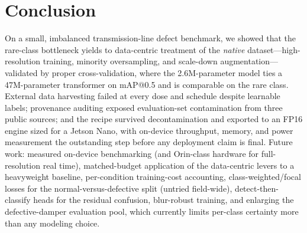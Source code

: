 \documentclass[conference]{IEEEtran}
\makeatletter
\newcommand{\map}{mAP@0.5}
\makeatother
\begin{document}
\section{Conclusion}
On a small, imbalanced transmission-line defect benchmark, we showed that the rare-class bottleneck yields to data-centric treatment of the \emph{native} dataset---high-resolution training, minority oversampling, and scale-down augmentation---validated by proper cross-validation, where the 2.6M-parameter model ties a 47M-parameter transformer on \map{} and is comparable on the rare class. External data harvesting failed at every dose and schedule despite learnable labels; provenance auditing exposed evaluation-set contamination from three public sources; and the recipe survived decontamination and exported to an FP16 engine sized for a Jetson Nano, with on-device throughput, memory, and power measurement the outstanding step before any deployment claim is final. Future work: measured on-device benchmarking (and Orin-class hardware for full-resolution real time), matched-budget application of the data-centric levers to a heavyweight baseline, per-condition training-cost accounting, class-weighted/focal losses for the normal-versus-defective split (untried field-wide), detect-then-classify heads for the residual confusion, blur-robust training, and enlarging the defective-damper evaluation pool, which currently limits per-class certainty more than any modeling choice.



\end{document}
